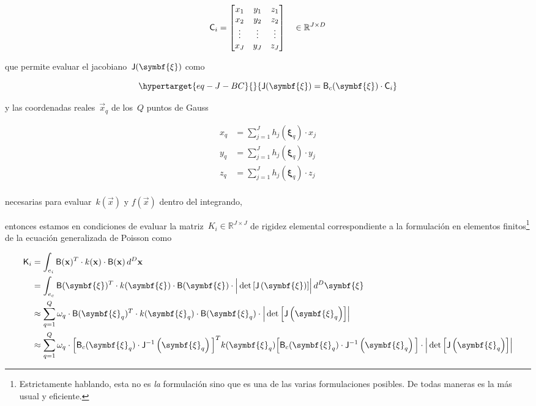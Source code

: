 \documentclass[
  12pt,
  a4paper,
  table]{scrbook}
\theoremstyle{plain}
\theoremstyle{definition}
\theoremstyle{plain}
\theoremstyle{plain}
\theoremstyle{remark}
\begin{document}
\begin{enumerate}
  \[
  \mathsf{C}_i =
  \begin{bmatrix}
  x_1 & y_1 & z_1  \\
  x_2 & y_2 & z_2  \\
  \vdots & \vdots & \vdots  \\
  x_J & y_J & z_J  \\
  \end{bmatrix} \quad \in \mathbb{R}^{J \times D}
  \]

  que permite evaluar el jacobiano~\(\mat{J}(\symbf{\xi})\) como

  \begin{equation}\protect\hypertarget{eq-J-BC}{}{
  \mat{J}(\symbf{\xi}) = \mat{B}_c(\symbf{\xi}) \cdot \mat{C}_i
  }\label{eq-J-BC}\end{equation}

  y las coordenadas reales~\(\vec{x}_q\) de los~\(Q\) puntos de Gauss

  \[
  \begin{aligned}
  x_q &= \sum_{j=1}^J h_j(\symbf{\xi}_q) \cdot x_j \\
  y_q &= \sum_{j=1}^J h_j(\symbf{\xi}_q) \cdot y_j \\
  z_q &= \sum_{j=1}^J h_j(\symbf{\xi}_q) \cdot z_j \\
  \end{aligned}
  \]

  necesarias para evaluar~\(k(\vec{x})\) y \(f(\vec{x})\) dentro del
  integrando,
\end{enumerate}

entonces estamos en condiciones de evaluar la
matriz~\(K_i \in \mathbb{R}^{J \times J}\) de rigidez elemental
correspondiente a la formulación en elementos finitos\footnote{Estrictamente
  hablando, esta no es \emph{la} formulación sino que es una de las
  varias formulaciones posibles. De todas maneras es la más usual y
  eficiente.} de la ecuación generalizada de Poisson como

\[
\begin{aligned}
\mat{K}_i &= \int_{e_i} \mat{B}(\vec{x})^T \cdot k(\vec{x}) \cdot \mat{B}(\vec{x}) \, d^D\vec{x} \\
&= \int_{e_c} \mat{B}(\symbf{\xi})^T \cdot k(\symbf{\xi}) \cdot \mat{B}(\symbf{\xi}) \cdot \Big|\det{\left[\mat{J}\left(\symbf{\xi}\right)\right]}\Big| \, d^D\symbf{\xi} \\
&\approx
\sum_{q=1}^Q \omega_q \cdot \mat{B}(\symbf{\xi}_q)^T \cdot k(\symbf{\xi}_q) \cdot \mat{B}(\symbf{\xi}_q) \cdot \Big|\det{\left[\mat{J}\left(\symbf{\xi}_q\right)\right]}\Big| \\
&\approx
\sum_{q=1}^Q \omega_q \cdot \Big[ \mat{B}_c(\symbf{\xi}_q) \cdot \mat{J}^{-1}\left(\symbf{\xi}_q\right) \Big]^T k(\symbf{\xi}_q) \Big[ \mat{B}_c(\symbf{\xi}_q) \cdot \mat{J}^{-1}\left(\symbf{\xi}_q\right) \Big] \cdot \Big|\det{\left[\mat{J}\left(\symbf{\xi}_q\right)\right]}\Big| \\
\end{aligned}
\]
\end{document}
